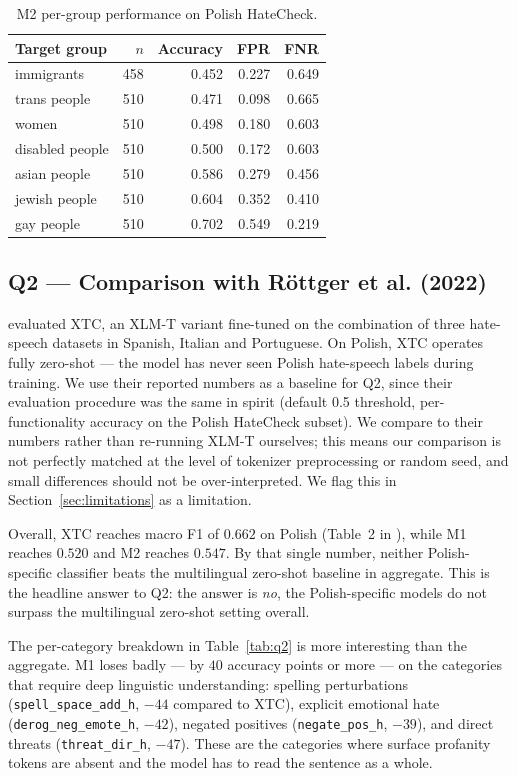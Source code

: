 \documentclass[11pt,a4paper]{article}
\begin{document}
\begin{table}[h]
\centering
\small
\begin{tabular}{lrrrr}
\toprule
Target group & $n$ & Accuracy & FPR & FNR \\
\midrule
immigrants & 458 & 0.452 & 0.227 & 0.649 \\
trans people & 510 & 0.471 & 0.098 & 0.665 \\
women & 510 & 0.498 & 0.180 & 0.603 \\
disabled people & 510 & 0.500 & 0.172 & 0.603 \\
asian people & 510 & 0.586 & 0.279 & 0.456 \\
jewish people & 510 & 0.604 & 0.352 & 0.410 \\
gay people & 510 & 0.702 & 0.549 & 0.219 \\
\bottomrule
\end{tabular}
\caption{M2 per-group performance on Polish HateCheck.}
\label{tab:m2_per_group}
\end{table}

\subsection{Q2 --- Comparison with Röttger et al. (2022)}
\label{sec:results-q2}

\citet{Rottger2022} evaluated XTC, an XLM-T variant fine-tuned on the combination of three hate-speech datasets in Spanish, Italian and Portuguese. On Polish, XTC operates fully zero-shot --- the model has never seen Polish hate-speech labels during training. We use their reported numbers as a baseline for Q2, since their evaluation procedure was the same in spirit (default 0.5 threshold, per-functionality accuracy on the Polish HateCheck subset). We compare to their numbers rather than re-running XLM-T ourselves; this means our comparison is not perfectly matched at the level of tokenizer preprocessing or random seed, and small differences should not be over-interpreted. We flag this in Section~\ref{sec:limitations} as a limitation.

Overall, XTC reaches macro F1 of $0.662$ on Polish (Table~2 in \citealp{Rottger2022}), while M1 reaches $0.520$ and M2 reaches $0.547$. By that single number, neither Polish-specific classifier beats the multilingual zero-shot baseline in aggregate. This is the headline answer to Q2: the answer is \textit{no}, the Polish-specific models do not surpass the multilingual zero-shot setting overall.

The per-category breakdown in Table~\ref{tab:q2} is more interesting than the aggregate. M1 loses badly --- by $40$ accuracy points or more --- on the categories that require deep linguistic understanding: spelling perturbations (\texttt{spell\_space\_add\_h}, $-44$ compared to XTC), explicit emotional hate (\texttt{derog\_neg\_emote\_h}, $-42$), negated positives (\texttt{negate\_pos\_h}, $-39$), and direct threats (\texttt{threat\_dir\_h}, $-47$). These are the categories where surface profanity tokens are absent and the model has to read the sentence as a whole.
\end{document}
